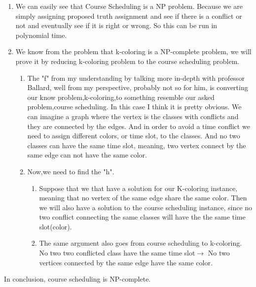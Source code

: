 \documentclass{article}
\begin{document}
\begin{enumerate}
    \item We can easily see that Course Scheduling is a NP problem. Because we are simply assigning proposed truth assignment and see if there is a conflict or not and eventually see if it is right or wrong. So this can be run in polynomial time. 
    \item We know from the problem that k-coloring is a NP-complete problem, we will prove it by reducing k-coloring problem to  the course scheduling problem.
    \begin{enumerate}
        \item The "f" from my understanding by talking more in-depth with professor Ballard, well from my perspective, probably not so for him, is converting our know problem,k-coloring,to something resemble our asked problem,course scheduling. In this case I think it is pretty obvious. We can imagine a graph where the vertex is the classes with conflicts and they are connected by the edges. And in order to avoid a time conflict we need to assign different colors, or time slot, to the classes. And no two classes can have the same time slot, meaning, two vertex connect by the same edge can not have the same color.
        \item Now,we need to find the "h". 
        \begin{enumerate}
            \item Suppose that we that have a solution for our K-coloring instance, meaning that no vertex of the same edge share the same color. Then we will also have a solution to the course scheduling instance, since no two conflict connecting the same classes will have the the same time slot(color). 
            \item The same argument also goes from course scheduling to k-coloring. No two two conflicted class have the same time slot$\rightarrow$ No two vertices connected by the same edge have the same color. 
        \end{enumerate}
    \end{enumerate}
\end{enumerate}
In conclusion, course scheduling is NP-complete. 
\end{document}
